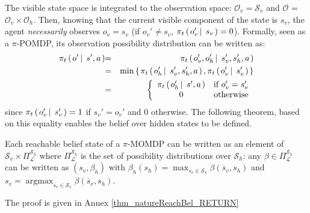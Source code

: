 The visible state space is integrated to the observation 
space: $\mathcal{O}_v=\mathcal{S}_v$ and $\mathcal{O}$ = $ \mathcal{O}_v \times \mathcal{O}_h$. Then, knowing
 that the current visible component of the state is $s_v$, the agent
 \textit{necessarily} observes $o_v=s_v$ (if $o_v' \neq s_v$, $\pi_t \left( \left.  o_v' \, \right| \left. \, s_v  \right. \right) = 0$).
 Formally, seen as a $\pi$-POMDP, its observation possibility 
distribution can be written as:
\begin{eqnarray} 
\nonumber \pi_t \paren{o' \sachant s',a } \hspace{-0.1cm}  & = & \pi_t \paren{ o_v',o_h' \sachant s_v',s_h',a } \\
\nonumber & = & \min \set{ \pi_t \paren{o_h' \sachant s_v',s_h',a }, \pi_t \paren{ o_v' \sachant s_v'} } \\
\label{simplif1}   & = & \left \{ \begin{array}{ccc} 
\pi_t \paren{ o_h' \sachant s',a } & \mbox{if  } o_v' = s_v' \\
0 & \mbox{otherwise} 
\end{array} \right.
\end{eqnarray}
since $\pi_t \left( \left.  o_v' \, \right| \left. \, s_v' \right. \right) = 1$ if $s_v'=o_v'$ and $0$ otherwise. 
The following theorem, based on this equality enables the
belief over hidden states to be defined.
\begin{theorem}
\label{thm_natureReachBel} Each reachable belief state of a $\pi$-MOMDP can be
written as an element of $\mathcal{S}_v \times \Pi^{\mathcal{S}_h}_{\mathcal{L}}$ where $\Pi^{\mathcal{S}_h}_{\mathcal{L}}$
is the set of possibility distributions over $\mathcal{S}_h$: any $\beta \in \Pi^{\mathcal{S}_h}_{\mathcal{L}}$
can be written as $(s_v,\beta_h)$ with $\beta_h(s_h) = \max_{\overline{s}_v \in \mathcal{S}_v} \beta(\overline{s}_v,s_h)$ and $s_v = \operatorname*{argmax}_{\overline{s}_v \in \mathcal{S}_v} \beta(\overline{s}_v,s_h)$.
\end{theorem}
The proof is given in Annex \ref{thm_natureReachBel_RETURN}

